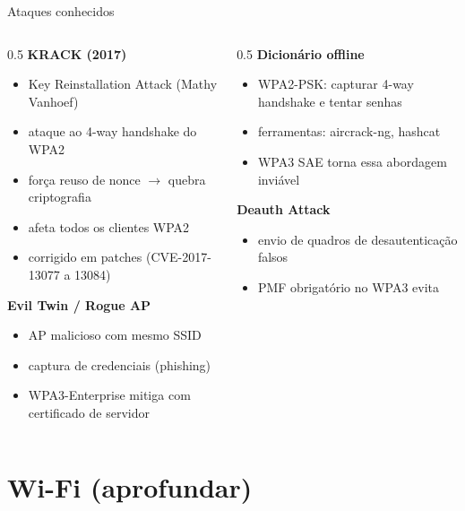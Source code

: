 \documentclass[aspectratio=169,11pt]{beamer}
\begin{document}
\begin{frame}{Ataques conhecidos}
  \begin{columns}
    \begin{column}{0.5\textwidth}
      \textbf{KRACK (2017)}
      \begin{itemize}
        \item Key Reinstallation Attack (Mathy Vanhoef)
        \item ataque ao 4-way handshake do WPA2
        \item força reuso de nonce $\rightarrow$ quebra criptografia
        \item afeta todos os clientes WPA2
        \item corrigido em patches (CVE-2017-13077 a 13084)
      \end{itemize}
      \textbf{Evil Twin / Rogue AP}
      \begin{itemize}
        \item AP malicioso com mesmo SSID
        \item captura de credenciais (phishing)
        \item WPA3-Enterprise mitiga com certificado de servidor
      \end{itemize}
    \end{column}
    \begin{column}{0.5\textwidth}
      \textbf{Dicionário offline}
      \begin{itemize}
        \item WPA2-PSK: capturar 4-way handshake e tentar senhas
        \item ferramentas: aircrack-ng, hashcat
        \item WPA3 SAE torna essa abordagem inviável
      \end{itemize}
      \textbf{Deauth Attack}
      \begin{itemize}
        \item envio de quadros de desautenticação falsos
        \item PMF obrigatório no WPA3 evita
      \end{itemize}
    \end{column}
  \end{columns}
\end{frame}

\section{Wi-Fi (aprofundar)}
\end{document}
